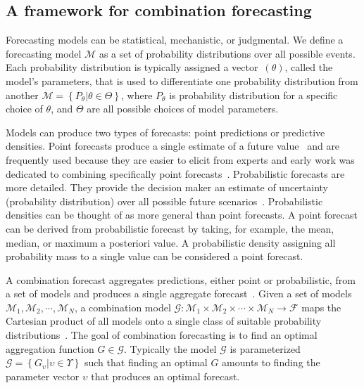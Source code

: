 \documentclass[preprint,authoryear,nonatbib]{elsarticle}
\def\l{\left}
\def\r{\right}
\begin{document}
\subsection{A framework for combination forecasting}

Forecasting models can be statistical, mechanistic, or judgmental. 
We define a forecasting model $\mathcal{M}$ as a set of probability distributions over all possible events.
Each probability distribution is typically assigned a vector~$(\theta)$, called the model's parameters, that is used to differentiate one probability distribution from another
$\mathcal{M} = \l\{ P_{\theta} | \theta \in \Theta \r\}$,
where $P_{\theta}$ is probability distribution for a specific choice of $\theta$, and $\Theta$ are all possible choices of model parameters.

Models can produce two types of forecasts: point predictions or predictive densities. 
Point forecasts produce a single estimate of a future value~\parencite{bates1969combination,granger1984improved} and are frequently used because they are easier to elicit from experts and early work was dedicated to combining specifically point forecasts~\parencite{granger1984improved,bates1969combination,galton1907vox}.
Probabilistic forecasts are more detailed. 
They provide the decision maker an estimate of uncertainty (probability distribution) over all possible future scenarios~\parencite{clemen1999combining,stone1961opinion,winkler1981combining,genest1986combining,winkler1968consensus,dawid1995coherent,ranjan2010combining,gneiting2013combining,hora2015calibration}. 
Probabilistic densities can be thought of as more general than point forecasts.
A point forecast can be derived from probabilistic forecast by taking, for example, the mean, median, or maximum a posteriori value.
A probabilistic density assigning all probability mass to a single value can be considered a point forecast.

A combination forecast aggregates predictions, either point or probabilistic, from a set of models and produces a single aggregate forecast~\parencite{clemen1999combining,winkler1981combining,genest1986combining,winkler2019probability}.
Given a set of models $\mathcal{M}_{1},\mathcal{M}_{2},\cdots,\mathcal{M}_{N}$, a combination model $\mathcal{G}:\mathcal{M}_{1} \times \mathcal{M}_{2} \times \cdots \times \mathcal{M}_{N} \to \mathcal{F}$ maps the Cartesian product of all models onto a single class of suitable probability distributions~\parencite{gneiting2013combining}.
The goal of combination forecasting is to find an optimal aggregation function $G \in \mathcal{G}$.
Typically the model $\mathcal{G}$ is parameterized $\mathcal{G} = \l\{ G_{\upsilon} | \upsilon \in \Upsilon \r\} $ such that finding an optimal $G$ amounts to finding the parameter vector $\upsilon$ that produces an optimal forecast.
\end{document}
